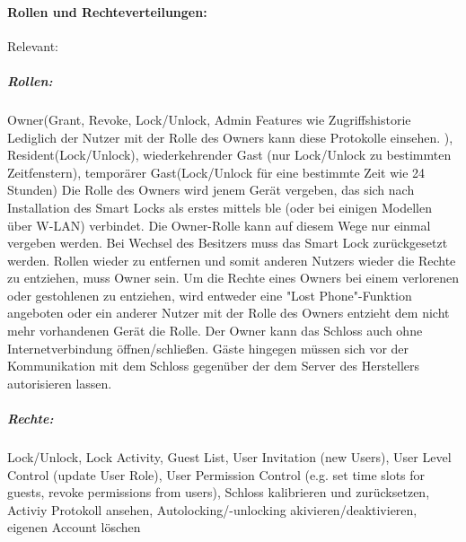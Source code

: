         \paragraph{Rollen und Rechteverteilungen:}
        Relevant: \cite{Ye2017}\cite{Ho2016}
		\subparagraph{Rollen:} Owner(Grant, Revoke, Lock/Unlock, Admin Features wie Zugriffshistorie Lediglich der Nutzer mit der Rolle des Owners kann diese Protokolle einsehen. ), Resident(Lock/Unlock), wiederkehrender Gast (nur Lock/Unlock zu bestimmten Zeitfenstern), temporärer Gast(Lock/Unlock für eine bestimmte Zeit wie 24 Stunden) 
		Die Rolle des Owners wird jenem Gerät vergeben, das sich nach Installation des Smart Locks als erstes mittels \gls{ble} (oder bei einigen Modellen über W-LAN) verbindet. 
   		Die Owner-Rolle kann auf diesem Wege nur einmal vergeben werden. 
   		Bei Wechsel des Besitzers muss das Smart Lock zurückgesetzt werden. 
   		Rollen wieder zu entfernen und somit anderen Nutzers wieder die Rechte zu entziehen, muss Owner sein. 
   		Um die Rechte eines Owners bei einem verlorenen oder gestohlenen zu entziehen, wird entweder eine "Lost Phone"-Funktion angeboten oder ein anderer Nutzer mit der Rolle des Owners entzieht dem nicht mehr vorhandenen Gerät die Rolle. 
   		Der Owner kann das Schloss auch ohne Internetverbindung öffnen/schließen. 
   		Gäste hingegen müssen sich vor der Kommunikation mit dem Schloss gegenüber der dem Server des Herstellers autorisieren lassen. 
		\subparagraph{Rechte:} Lock/Unlock, Lock Activity, Guest List, User Invitation (new Users), User Level Control (update User Role), User Permission Control (e.g. set time slots for guests, revoke permissions from users), Schloss kalibrieren und zurücksetzen\cite{Fuller2017}, Activiy Protokoll ansehen\cite{Fuller2017}, Autolocking/-unlocking akivieren/deaktivieren, eigenen Account löschen
		
